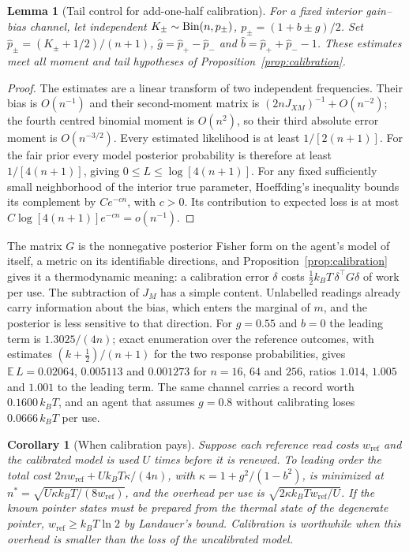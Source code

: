 \documentclass[12pt]{article}
\newtheorem{lemma}[theorem]{Lemma}
\newtheorem{corollary}[theorem]{Corollary}
\begin{document}
\begin{lemma}[Tail control for add-one-half calibration]
\label{lem:addhalf}
For a fixed interior gain--bias channel, let independent
$K_\pm\sim{\rm Bin}(n,p_\pm)$, $p_\pm=(1+b\pm g)/2$.
Set $\hat p_\pm=(K_\pm+1/2)/(n+1)$,
$\hat g=\hat p_+-\hat p_-$ and $\hat b=\hat p_++\hat p_--1$.
These estimates meet all moment and tail hypotheses of
Proposition~\ref{prop:calibration}.
\end{lemma}
\begin{proof}
The estimates are a linear transform of two independent frequencies.
Their bias is $O(n^{-1})$ and their second-moment matrix is
$(2nJ_{XM})^{-1}+O(n^{-2})$; the fourth centred binomial moment
is $O(n^2)$, so their third absolute error moment is $O(n^{-3/2})$.
Every estimated likelihood is at least $1/[2(n+1)]$.
For the fair prior every model posterior probability is therefore
at least $1/[4(n+1)]$, giving $0\le L\le\log[4(n+1)]$.
For any fixed sufficiently small neighborhood of the interior true
parameter, Hoeffding's inequality bounds its complement by
$C e^{-cn}$, with $c>0$. Its contribution to expected loss is at most
$C\log[4(n+1)]e^{-cn}=o(n^{-1})$.
\end{proof}

The matrix $G$ is the nonnegative posterior Fisher form on the agent's model of itself, a metric on its identifiable directions, and Proposition~\ref{prop:calibration} gives it a thermodynamic meaning: a calibration error $\delta$ costs $\tfrac12k_BT\,\delta^{\top}G\delta$ of work per use. The subtraction of $J_M$ has a simple content. Unlabelled readings already carry information about the bias, which enters the marginal of $m$, and the posterior is less sensitive to that direction. For $g=0.55$ and $b=0$ the leading term is $1.3025/(4n)$; exact enumeration over the reference outcomes, with estimates $(k+\tfrac12)/(n+1)$ for the two response probabilities, gives $\mathbb E\,L=0.02064$, $0.005113$ and $0.001273$ for $n=16$, $64$ and $256$, ratios $1.014$, $1.005$ and $1.001$ to the leading term. The same channel carries a record worth $0.1600\,k_BT$, and an agent that assumes $g=0.8$ without calibrating loses $0.0666\,k_BT$ per use.

\begin{corollary}[When calibration pays]
\label{cor:amortization}
Suppose each reference read costs $w_{\mathrm{ref}}$ and the calibrated model is used $U$ times before it is renewed. To leading order the total cost $2nw_{\mathrm{ref}}+Uk_BT\kappa/(4n)$, with $\kappa=1+g^2/(1-b^2)$, is minimized at $n^*=\sqrt{U\kappa k_BT/(8w_{\mathrm{ref}})}$, and the overhead per use is $\sqrt{2\kappa k_BTw_{\mathrm{ref}}/U}$. If the known pointer states must be prepared from the thermal state of the degenerate pointer, $w_{\mathrm{ref}}\ge k_BT\ln2$ by Landauer's bound. Calibration is worthwhile when this overhead is smaller than the loss of the uncalibrated model.
\end{corollary}
\end{document}
